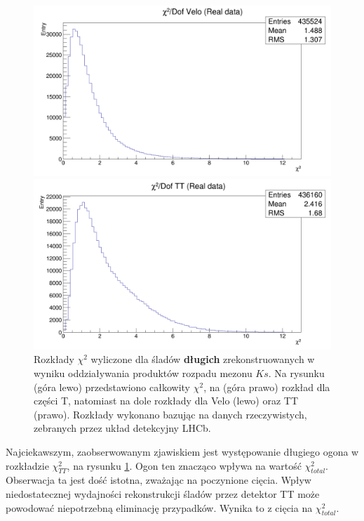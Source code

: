 \begin{figure}[h]
\vspace*{0.5cm} %
\begin{minipage}[t]{0.45\textwidth}
\includegraphics[width=\linewidth]{rozdzial6/KsLL_chi2Velo_data.png}
\end{minipage}
\hspace{\fill}
\begin{minipage}[t]{0.5\textwidth}
\includegraphics[width=\linewidth]{rozdzial6/KsLL_chi2TT_data.png}
\end{minipage}
\caption{Rozkłady $\chi^2$ wyliczone dla śladów \textbf{długich} zrekonstruowanych w wyniku oddziaływania produktów rozpadu mezonu $Ks$. Na rysunku (góra lewo) przedstawiono całkowity $\chi^2$, na (góra prawo) rozkład dla części T, natomiast na dole rozkłady dla Velo (lewo) oraz TT (prawo). Rozkłady wykonano bazując na danych rzeczywistych, zebranych przez układ detekcyjny LHCb.} \label{chi2KsLL_data}
\end{figure}

Najciekawszym, zaobserwowanym  zjawiskiem jest występowanie długiego ogona w rozkładzie $\chi^2_{TT}$, na rysunku \ref{chi2KsLL_data}. Ogon ten znacząco wpływa na wartość $\chi^2_{total}$. Obserwacja ta jest dość istotna, zważając na poczynione cięcia. Wpływ niedostatecznej wydajności rekonstrukcji śladów przez detektor TT może powodować niepotrzebną eliminację  przypadków. Wynika to z cięcia na $\chi^2_{total}$.

